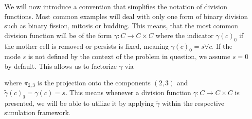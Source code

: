 We will now introduce a convention that simplifies the notation of division functions.
Most common examples will deal with only one form of binary division such as binary fission, mitosis
or budding.
This means, that the most common division function will be of the form
$\gamma:C\rightarrow C\times C$ where the indicator $\gamma(c)_0$ if the mother cell is removed or
persists is fixed, meaning $\gamma(c)_0=s\forall c$.
If the mode $s$ is not defined by the context of the problem in question, we assume $s=0$ by
default.
This allows us to factorize $\gamma$ via
\begin{center}
\end{center}
where $\pi_{2,3}$ is the projection onto the components $(2,3)$ and
$\tilde{\gamma}(c)_0=\gamma(c)=s$.
This means whenever a division function $\gamma:C\rightarrow C\times C$ is presented, we will be
able to utilize it by applying $\tilde{\gamma}$ within the respective simulation framework.

